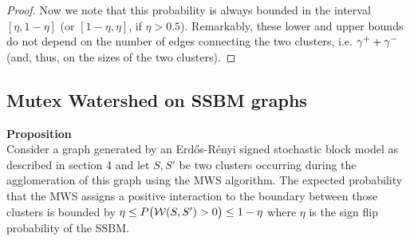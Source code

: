 \begin{proof}
Now we note that this probability is always bounded in the interval $[\eta, 1-\eta]$ (or $[1-\eta, \eta]$, if $\eta>0.5$). Remarkably, these lower and upper bounds do not depend on the number of edges connecting the two clusters, i.e. $\gamma^+ + \gamma^-$ (and, thus, on the sizes of the two clusters). 
\end{proof}

\subsection{Mutex Watershed on SSBM graphs}
\textbf{Proposition} \\
Consider a graph generated by an Erd\H os-R\'enyi signed stochastic block model as described in section 4 and let $S, S'$ be two clusters occurring during the agglomeration of this graph using the MWS algorithm. The expected probability that the MWS assigns a positive interaction to the boundary between those clusters is bounded by $\eta \leq P\big(\mathcal{W}(S,S')>0\big) \leq 1-\eta$ where $\eta$ is the sign flip probability of the SSBM.


